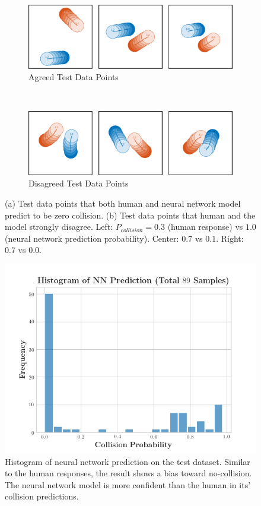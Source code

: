 \begin{figure}[t]
	\begin{subfigure}[t]{1\linewidth}
		\centering
		\includegraphics[width=0.95\linewidth]{figures/agree.pdf}
		\caption{Agreed Test Data Points}
		\label{fig:nn-agree}
	\end{subfigure}
    \\
    \par\bigskip
	\begin{subfigure}[t]{1\linewidth}
		\centering
		\includegraphics[width=0.95\linewidth]{figures/disagree.pdf}
		\caption{Disagreed Test Data Points}
		\label{fig:nn-disagree}
	\end{subfigure}
	\caption{(a) Test data points that both human and neural network model predict to be zero collision. (b) Test data points that human and the model strongly disagree. Left: $P_{collision} = 0.3$ (human response) vs $1.0$ (neural network prediction probability). Center: $0.7$ vs $0.1$. Right: $0.7$ vs $0.0$.}
	\label{fig:nn-analysis}
\end{figure}

\begin{figure}[t]
  \centering
  \includegraphics[width=\linewidth]{figures/nn_hist.png}
  \caption{Histogram of neural network prediction on the test dataset. Similar to the human responses, the result shows a bias toward no-collision. The neural network model is more confident than the human in its' collision predictions.}
  \label{fig:nn_hist}
\end{figure}

